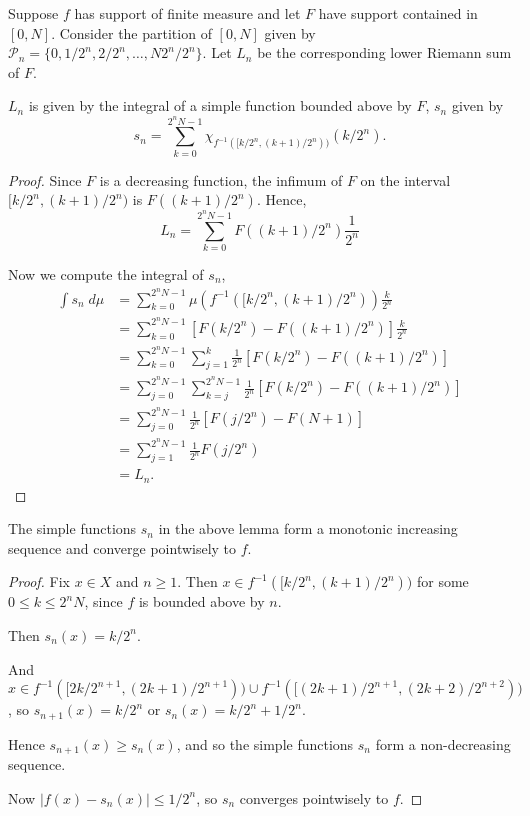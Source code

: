 \documentclass{unswmaths}
\begin{document}
Suppose $f$ has support of finite measure and let $F$ have support contained in $[0,N]$. 
Consider the partition of $[0,N]$ given by $\mathcal{P}_n = \{0,1/2^n,2/2^n,\ldots,N2^n/2^n\}$.
Let $L_n$ be the corresponding lower Riemann sum of $F$.

\begin{lemma}
    $L_n$ is given by the integral of a simple function bounded above by $F$, $s_n$
    given by
    \begin{equation*}
        s_n = \sum_{k=0}^{2^nN-1} \chi_{f^{-1}([k/2^n,(k+1)/2^n))} (k/2^n).
    \end{equation*}
\end{lemma}
\begin{proof}
    Since $F$ is a decreasing function, the infimum of $F$ on the interval $[k/2^n,(k+1)/2^n)$
    is $F((k+1)/2^n)$.
    Hence,
    \begin{equation*}
        L_n = \sum_{k=0}^{2^nN-1} F((k+1)/2^n)\frac{1}{2^n}
    \end{equation*}
    
    Now we compute the integral of $s_n$,
    \begin{align*}
         \int s_n\;d\mu &= \sum_{k=0}^{2^nN-1} \mu(f^{-1}([k/2^n,(k+1)/2^n))\frac{k}{2^n}\\
         &= \sum_{k=0}^{2^nN-1} [F(k/2^n)-F((k+1)/2^n)] \frac{k}{2^n}\\
         &= \sum_{k=0}^{2^nN-1} \sum_{j=1}^{k} \frac{1}{2^n}[F(k/2^n)-F((k+1)/2^n)]\\
         &= \sum_{j=0}^{2^nN-1} \sum_{k={j}}^{2^nN-1} \frac{1}{2^n}[F(k/2^n)-F((k+1)/2^n)]\\
         &= \sum_{j=0}^{2^nN-1} \frac{1}{2^n}[F(j/2^n)-F(N+1)]\\
         &= \sum_{j=1}^{2^nN-1} \frac{1}{2^n}F(j/2^n)\\
         &= L_n.
    \end{align*}
\end{proof}
\begin{lemma}
    The simple functions $s_n$ in the above lemma form a monotonic increasing
    sequence and converge pointwisely to $f$.
\end{lemma}
\begin{proof}
    
    Fix $x \in X$ and $n \geq 1$. Then $x \in f^{-1}([k/2^n,(k+1)/2^n))$ for
    some $0 \leq k \leq 2^nN$, since $f$ is bounded above by $n$.
    
    Then $s_n(x) = k/2^n$.
    
    And $x \in f^{-1}([2k/2^{n+1},(2k+1)/2^{n+1}))\cup f^{-1}([(2k+1)/2^{n+1},(2k+2)/2^{n+2}))$,
    so $s_{n+1}(x) = k/2^n$ or $s_n(x) = k/2^n + 1/2^n$.
    
    Hence $s_{n+1}(x) \geq s_n(x)$, and so the simple functions
    $s_n$ form a non-decreasing sequence.
    
    Now $|f(x)-s_n(x)| \leq 1/2^n$, so $s_n$
    converges pointwisely to $f$.
\end{proof}
\end{document}
